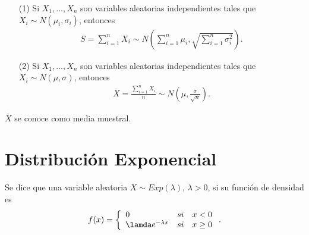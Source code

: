 \begin{prop}
\begin{enumerate}
    \item[(1)] Si $X_1, ..., X_n$ son variables aleatorias independientes tales que $X_i \sim N(\mu_i, \sigma_i)$, entonces
    \begin{align*}
        S = \sum_{i=1}^{n}{X_i} \sim N\left(\sum_{i=1}^{n}{\mu_i}, \sqrt{\sum_{i=1}^{n}{\sigma_i^2}}\right).
    \end{align*}
    \item[(2)] Si $X_1, ..., X_n$ son variables aleatorias independientes tales que $X_i \sim N(\mu, \sigma)$, entonces
    \begin{align*}
        \overline{X} = \frac{\sum_{i=1}^{n}{X_i}}{n} \sim N\left( \mu, \frac{\sigma}{\sqrt{n}}\right).
    \end{align*} 
\end{enumerate}
$\overline{X}$ se conoce como media muestral.
\end{prop}

\section{Distribución Exponencial}

\begin{defi}
Se dice que una variable aleatoria $X \sim Exp(\lambda)$, $\lambda > 0$, si su función de densidad es
\begin{align*}
    f(x) = \left\{ \begin{array}{lcc}
             0 &  si  & x < 0\\
             \lamda e^{-\lambda x} &  si  & x \ge 0\\
             \end{array}
        \right. . 
\end{align*}
\end{defi}

